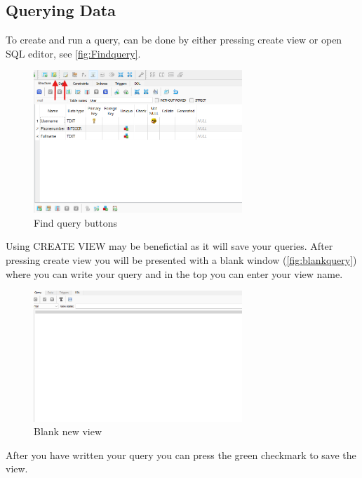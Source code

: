 \documentclass[a4paper,11pt,oneside]{article}
\begin{document}
\begin{sloppypar}
\subsection{Querying Data}
\label{sqliteStudioQueryingData}
To create and run a query, can be done by either pressing create view or open SQL editor, see \autoref{fig:Findquery}.
\begin{figure}[!htb]
  \centering
  \includegraphics[width=0.7\textwidth]{sqlitestudio/queries/create_query_find.png}
  \caption{Find query buttons}
  \label{fig:Findquery}
\end{figure} 
Using CREATE VIEW may be benefictial as it will save your queries. After pressing create view you will be presented with a blank window (\autoref{fig:blankquery}) where you can write your query and in the top you can enter your view name.
\begin{figure}[!htb]
  \centering
  \includegraphics[width=0.7\textwidth]{sqlitestudio/queries/create_query_blank.png}
  \caption{Blank new view}
  \label{fig:blankquery}
\end{figure} 
After you have written your query you can press the green checkmark to save the view. 


\end{sloppypar}
\end{document}
